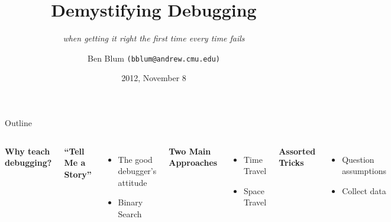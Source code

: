 \documentclass[xcolor=dvipsnames]{beamer}
\title[Demystifying Debugging]{{\bf Demystifying Debugging}}
\subtitle[]{{\em when getting it right the first time every time fails}}
\author[Ben Blum]{Ben Blum \texttt{(bblum@andrew.cmu.edu)}}
\institute[98-172]{Great Practical Ideas for Computer Scientists}
\date[]{2012, November 8}
\begin{document}
\normalem
\begin{frame}
	\titlepage
\end{frame}


\newcommand\linegap{\vspace{0.2in}}
\newcommand\breakslide[1]{\begin{frame}{} \begin{center} \Large #1 \end{center} \end{frame}}
\newcommand\related[1]{\textsuperscript{\em [#1]}}
\newcommand\hilight[2]{\color{#1}#2\color{black}}


\begin{frame}{Outline}
	\begin{columns}[l]
	\textbf{Why teach debugging?}
	\linegap

	\textbf{``Tell Me a Story''}
	\begin{itemize}
		\item The good debugger's attitude
		\item Binary Search
	\end{itemize}
	\linegap

	{\bf Two Main Approaches}
	\begin{itemize}
		\item Time Travel
		\item Space Travel
	\end{itemize}
	\linegap

	{\bf Assorted Tricks}
	\begin{itemize}
		\item Question assumptions
		\item Collect data
	\end{itemize}
	\end{columns}
\end{frame}
\end{document}
